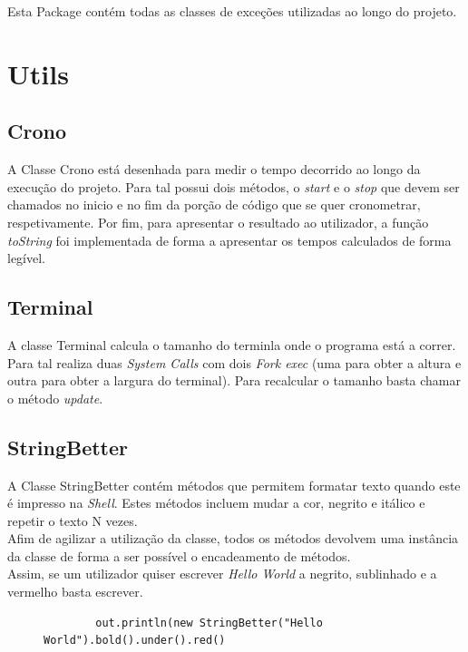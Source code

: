 \documentclass[a4paper]{report}
\begin{document}
Esta Package contém todas as classes de exceções utilizadas ao longo do projeto.

\section{Utils}

\subsection{Crono}

A Classe Crono está desenhada para medir o tempo decorrido ao longo da execução do projeto.
Para tal possui dois métodos, o \textit{start} e o \textit{stop} que devem ser chamados no
inicio e no fim da porção de código que se quer cronometrar, respetivamente.
Por fim, para apresentar o resultado ao utilizador, a função \textit{toString} foi implementada
de forma a apresentar os tempos calculados de forma legível.

\subsection{Terminal}

A classe Terminal calcula o tamanho do terminla onde o programa está a correr.
Para tal realiza duas \textit{System Calls} com dois \textit{Fork exec} (uma para obter a altura
e outra para obter a largura do terminal).
Para recalcular o tamanho basta chamar o método \textit{update}.

\subsection{StringBetter}

A Classe StringBetter contém métodos que permitem formatar texto quando este é impresso na
\textit{Shell}. Estes métodos incluem mudar a cor, negrito e itálico e repetir o texto N vezes.\\
Afim de agilizar a utilização da classe, todos os métodos devolvem uma instância da classe
de forma a ser possível o encadeamento de métodos.\\
Assim, se um utilizador quiser escrever \textit{Hello World} a negrito, sublinhado e a
vermelho basta escrever.
\begin{figure}[H]
    \begin{center}
        \begin{verbatim}
        out.println(new StringBetter("Hello World").bold().under().red()
        \end{verbatim}
    \end{center}
\end{figure}
\end{document}
